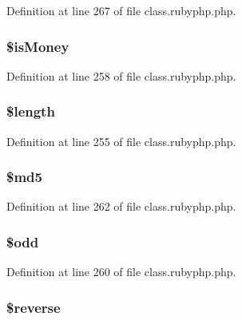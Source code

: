 Definition at line 267 of file class.\-rubyphp.\-php.

\hypertarget{classr_aa2f5c87cc7b1ab41965e940d5c1406d9}{
\subsubsection[{\$is\-Money}]{\setlength{\rightskip}{0pt plus 5cm}\$is\-Money}}\label{classr_aa2f5c87cc7b1ab41965e940d5c1406d9}


Definition at line 258 of file class.\-rubyphp.\-php.

\hypertarget{classr_adf14d8e29912c1855022dfa252aa4087}{
\subsubsection[{\$length}]{\setlength{\rightskip}{0pt plus 5cm}\${\bf length}}}\label{classr_adf14d8e29912c1855022dfa252aa4087}


Definition at line 255 of file class.\-rubyphp.\-php.

\hypertarget{classr_a2557b214f57a046187b88572e443da1f}{
\subsubsection[{\$md5}]{\setlength{\rightskip}{0pt plus 5cm}\${\bf md5}}}\label{classr_a2557b214f57a046187b88572e443da1f}


Definition at line 262 of file class.\-rubyphp.\-php.

\hypertarget{classr_aee2d4fa4e98da4e6ad23bee644ab5e7a}{
\subsubsection[{\$odd}]{\setlength{\rightskip}{0pt plus 5cm}\${\bf odd}}}\label{classr_aee2d4fa4e98da4e6ad23bee644ab5e7a}


Definition at line 260 of file class.\-rubyphp.\-php.

\hypertarget{classr_ae0d210fd358fa750a11e63b26f6d26ea}{
\subsubsection[{\$reverse}]{\setlength{\rightskip}{0pt plus 5cm}\$reverse}}\label{classr_ae0d210fd358fa750a11e63b26f6d26ea}


